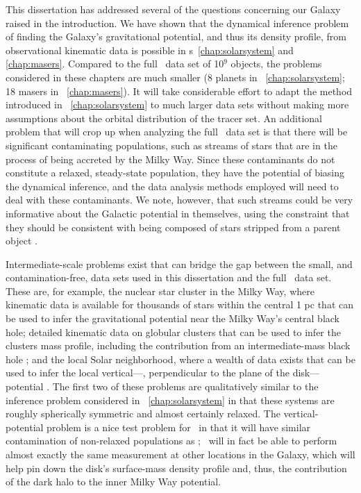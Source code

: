 This dissertation has addressed several of the questions concerning
our Galaxy raised in the introduction. We have shown that the
dynamical inference problem of finding the Galaxy's gravitational
potential, and thus its density profile, from observational kinematic
data is possible in \chaptername s~\ref{chap:solarsystem}
and \ref{chap:masers}. Compared to the full \Gaia\ data set of 10$^9$
objects, the problems considered in these chapters are much smaller (8
planets in \chaptername~\ref{chap:solarsystem}; 18 masers
in \chaptername~\ref{chap:masers}). It will take considerable effort
to adapt the method introduced in \chaptername~\ref{chap:solarsystem}
to much larger data sets without making more assumptions about the
orbital distribution of the tracer set. An additional problem that
will crop up when analyzing the full \Gaia\ data set is that there
will be significant contaminating populations, such as streams of
stars that are in the process of being accreted by the Milky
Way. Since these contaminants do not constitute a relaxed,
steady-state population, they have the potential of biasing the
dynamical inference, and the data analysis methods employed will need
to deal with these contaminants. We note, however, that such streams
could be very informative about the Galactic potential in themselves,
using the constraint that they should be consistent with being
composed of stars stripped from a parent
object \citep[\eg,][]{Koposov09a}.

Intermediate-scale problems exist that can bridge the gap between the
small, and contamination-free, data sets used in this dissertation and
the full \Gaia\ data set. These are, for example, the nuclear star
cluster in the Milky Way, where kinematic data is available for
thousands of stars within the central 1 pc \citep{Schoedel09a} that
can be used to infer the gravitational potential near the Milky Way's
central black hole; detailed kinematic data on globular clusters that
can be used to infer the clusters mass profile, including the
contribution from an intermediate-mass black hole \citep{Anderson10a};
and the local Solar neighborhood, where a wealth of data exists that
can be used to infer the local vertical---\ie, perpendicular to the
plane of the disk---potential \citep[\eg, RAVE;][]{Zwitter08a}. The
first two of these problems are qualitatively similar to the inference
problem considered in \chaptername~\ref{chap:solarsystem} in that
these systems are roughly spherically symmetric and almost certainly
relaxed. The vertical-potential problem is a nice test problem
for \Gaia\ in that it will have similar contamination of non-relaxed
populations as \Gaia; \Gaia\ will in fact be able to perform almost
exactly the same measurement at other locations in the Galaxy, which
will help pin down the disk's surface-mass density profile and, thus,
the contribution of the dark halo to the inner Milky Way potential.

